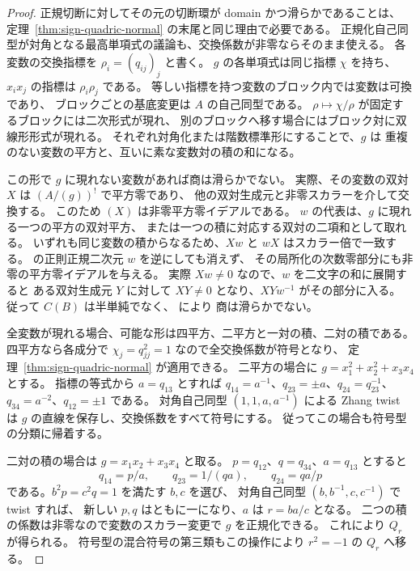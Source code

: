 \begin{proof}
正規切断に対してその元の切断環が domain かつ滑らかであることは、
定理~\ref{thm:sign-quadric-normal} の末尾と同じ理由で必要である。
正規化自己同型が対角となる最高単項式の議論も、交換係数が非零ならそのまま使える。
各変数の交換指標を $\rho_i=(q_{ij})_j$ と書く。
$g$ の各単項式は同じ指標 $\chi$ を持ち、
$x_i x_j$ の指標は $\rho_i\rho_j$ である。
等しい指標を持つ変数のブロック内では変数は可換であり、
ブロックごとの基底変更は $A$ の自己同型である。
$\rho\mapsto\chi/\rho$ が固定するブロックには二次形式が現れ、
別のブロックへ移す場合にはブロック対に双線形形式が現れる。
それぞれ対角化または階数標準形にすることで、$g$ は
重複のない変数の平方と、互いに素な変数対の積の和になる。

この形で $g$ に現れない変数があれば商は滑らかでない。
実際、その変数の双対 $X$ は $(A/(g))^!$ で平方零であり、
他の双対生成元と非零スカラーを介して交換する。
このため $(X)$ は非零平方零イデアルである。
$w$ の代表は、$g$ に現れる一つの平方の双対平方、
または一つの積に対応する双対の二項和として取れる。
いずれも同じ変数の積からなるため、$Xw$ と $wX$ はスカラー倍で一致する。
\cite[Lemma 4.11]{MU2022} の正則正規二次元 $w$ を逆にしても消えず、
その局所化の次数零部分にも非零の平方零イデアルを与える。
実際 $Xw\ne0$ なので、$w$ を二文字の和に展開すると
ある双対生成元 $Y$ に対して $XY\ne0$ となり、$XYw^{-1}$ がその部分に入る。
従って $C(B)$ は半単純でなく、\cite[Theorem 5.5]{MU2022} により
商は滑らかでない。

全変数が現れる場合、可能な形は四平方、二平方と一対の積、二対の積である。
四平方なら各成分で $\chi_j=q_{jj}^2=1$ なので全交換係数が符号となり、
定理~\ref{thm:sign-quadric-normal} が適用できる。
二平方の場合に $g=x_1^2+x_2^2+x_3x_4$ とする。
指標の等式から $a=q_{13}$ とすれば
$q_{14}=a^{-1}$、$q_{23}=\pm a$、$q_{24}=q_{23}^{-1}$、
$q_{34}=a^{-2}$、$q_{12}=\pm1$ である。
対角自己同型 $(1,1,a,a^{-1})$ による Zhang twist は
$g$ の直線を保存し、交換係数をすべて符号にする。
従ってこの場合も符号型の分類に帰着する。

二対の積の場合は $g=x_1x_2+x_3x_4$ と取る。
$p=q_{12}$、$q=q_{34}$、$a=q_{13}$ とすると
\[
 q_{14}=p/a,\qquad q_{23}=1/(qa),\qquad q_{24}=qa/p
\]
である。$b^2p=c^2q=1$ を満たす $b,c$ を選び、
対角自己同型 $(b,b^{-1},c,c^{-1})$ で twist すれば、
新しい $p,q$ はともに一になり、$a$ は $r=ba/c$ となる。
二つの積の係数は非零なので変数のスカラー変更で $g$ を正規化できる。
これにより $Q_r$ が得られる。
符号型の混合符号の第三類もこの操作により $r^2=-1$ の $Q_r$ へ移る。


\end{proof}
